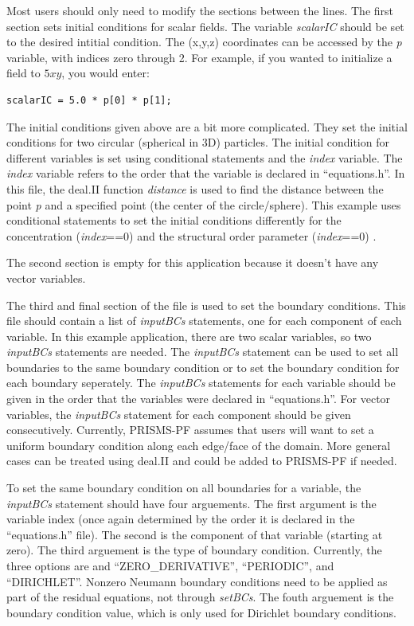 \documentclass[10pt]{article} %
\begin{document}
Most users should only need to modify the sections between the lines. The first section sets initial conditions for scalar fields. The variable \emph{scalarIC} should be set to the desired intitial condition. The (x,y,z) coordinates can be accessed by the \emph{p} variable, with indices zero through 2. For example, if you wanted to initialize a field to $5xy$, you would enter:
\tiny
\begin{lstlisting} 
scalarIC = 5.0 * p[0] * p[1];
\end{lstlisting} \normalsize
The initial conditions given above are a bit more complicated. They set the initial conditions for two circular (spherical in 3D) particles. The initial condition for different variables is set using conditional statements and the \emph{index} variable. The \emph{index} variable refers to the order that the variable is declared in ``equations.h''. In this file, the deal.II function \emph{distance} is used to find the distance between the point \emph{p} and a specified point (the center of the circle/sphere). This example uses conditional statements to set the initial conditions differently for the concentration (\emph{index}==0) and the structural order parameter  (\emph{index}==0) .

The second section is empty for this application because it doesn't have any vector variables.

The third and final section of the file is used to set the boundary conditions. This file should contain a list of \emph{inputBCs} statements, one for each component of each variable. In this example application, there are two scalar variables, so two \emph{inputBCs} statements are needed. The \emph{inputBCs} statement can be used to set all boundaries to the same boundary condition or to set the boundary condition for each boundary seperately. The \emph{inputBCs} statements for each variable should be given in the order that the variables were declared in ``equations.h''. For vector variables, the  \emph{inputBCs} statement for each component should be given consecutively. Currently, PRISMS-PF assumes that users will want to set a uniform boundary condition along each edge/face of the domain. More general cases can be treated using deal.II and could be added to PRISMS-PF if needed.

To set the same boundary condition on all boundaries for a variable, the \emph{inputBCs} statement should have four arguements. The first argument is the variable index (once again determined by the order it is declared in the ``equations.h'' file). The second is the component of that variable (starting at zero). The third arguement is the type of boundary condition. Currently, the three options are and ``ZERO\_DERIVATIVE'', ``PERIODIC'', and ``DIRICHLET''. Nonzero Neumann boundary conditions need to be applied as part of the residual equations, not through \emph{setBCs}. The fouth arguement is the boundary condition value, which is only used for Dirichlet boundary conditions.
\end{document}
